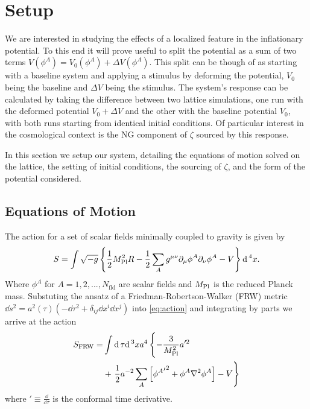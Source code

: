 
\section{Setup} \label{sec:setup}
We are interested in studying the effects of a localized feature in the inflationary potential.
To this end it will prove useful to split the potential as a sum of two terms $V(\phi^A) = V_0(\phi^A) + \Delta V(\phi^A)$.
This split can be though of as starting with a baseline system and applying a stimulus by deforming the potential, $V_0$ being the baseline and $\Delta V$ being the stimulus.
The system's response can be calculated by taking the difference between two lattice simulations, one run with the deformed potential $V_0+\Delta V$ and the other with the baseline potential $V_0$, with both runs starting from identical initial conditions.
Of particular interest in the cosmological context is the NG component of $\zeta$ sourced by this response.

In this section we setup our system, detailing the equations of motion solved on the lattice, the setting of initial conditions, the sourcing of $\zeta$, and the form of the potential considered.

\subsection{Equations of Motion}

The action for a set of scalar fields minimally coupled to gravity is given by
\begin{equation} \label{eq:action}
  S = \int \sqrt{-g}\left\{\frac{1}{2}M_{\mathrm{Pl}}^2R - \frac{1}{2}\sum_Ag^{\mu\nu}\partial_\mu\phi^A\partial_\nu\phi^A - V \right\}\mathrm{d}\,^4x.
\end{equation}
Where $\phi^A$ for $A=1,2,...,N_\mathrm{fld}$ are scalar fields and $M_{\mathrm{Pl}}$ is the reduced Planck mass. 
Substuting the ansatz of a Friedman-Robertson-Walker (FRW) metric $\dd s^2 = a^2(\tau)\left( -\dd\tau^2 + \delta_{ij}\dd x^i\dd x^j \right)$ into \eqref{eq:action} and integrating by parts we arrive at the action
\begin{align} \label{eq:actionFRW}
  \begin{split}
    S_{\mathrm{FRW}} = &\int \dd\tau\dd^3xa^4\left\{
    - \frac{3}{\mpl^2}a'^2 \vphantom{\sum_A}\right. \\
    & + \left.\frac{1}{2}a^{-2}\sum_A\left[{{\phi^A}'}^2
      + \phi^A\nabla^2\phi^A\right] %
      - V \right\}
    \end{split}
\end{align}
where ${}' \equiv \frac{\dd}{\dd\tau}$ is the conformal time derivative.

